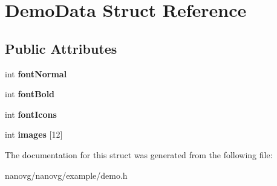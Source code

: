 \hypertarget{struct_demo_data}{\section{Demo\+Data Struct Reference}
\label{struct_demo_data}
}
\subsection*{Public Attributes}
\begin{DoxyCompactItemize}
\item 
\hypertarget{struct_demo_data_a8ced488ac1d514309a8049d220ce5c0a}{int {\bfseries font\+Normal}}\label{struct_demo_data_a8ced488ac1d514309a8049d220ce5c0a}

\item 
\hypertarget{struct_demo_data_a621e9a1935cb1d059b5c645cb42962c3}{int {\bfseries font\+Bold}}\label{struct_demo_data_a621e9a1935cb1d059b5c645cb42962c3}

\item 
\hypertarget{struct_demo_data_afb67402502e3220ae299b90d3f2e78f1}{int {\bfseries font\+Icons}}\label{struct_demo_data_afb67402502e3220ae299b90d3f2e78f1}

\item 
\hypertarget{struct_demo_data_ab83c53eef9350fd1ff4cd910035a260a}{int {\bfseries images} \mbox{[}12\mbox{]}}\label{struct_demo_data_ab83c53eef9350fd1ff4cd910035a260a}

\end{DoxyCompactItemize}


The documentation for this struct was generated from the following file\+:\begin{DoxyCompactItemize}
\item 
nanovg/nanovg/example/demo.\+h\end{DoxyCompactItemize}
